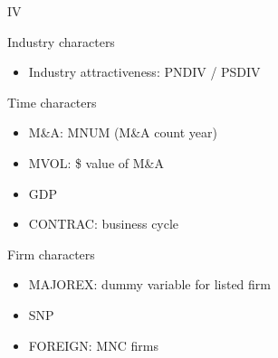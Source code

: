 \documentclass[aspectratio=169,xcolor=dvipsnames]{beamer}
\begin{document}
\begin{frame}{IV}
    \begin{block}{Industry characters}
        \begin{itemize}
            \item Industry attractiveness: PNDIV / PSDIV

        \end{itemize}

    \end{block}
    \begin{block}{Time characters}
        \begin{itemize}
            \item M\&A: MNUM (M\&A count year)
            \item MVOL: \$ value of M\&A
            \item GDP
            \item CONTRAC: business cycle

        \end{itemize}
    \end{block}

    \begin{block}{Firm characters}
        \begin{itemize}
            \item MAJOREX: dummy variable for listed firm
            \item SNP
            \item FOREIGN: MNC firms

        \end{itemize}
    \end{block}

\end{frame}
\end{document}

